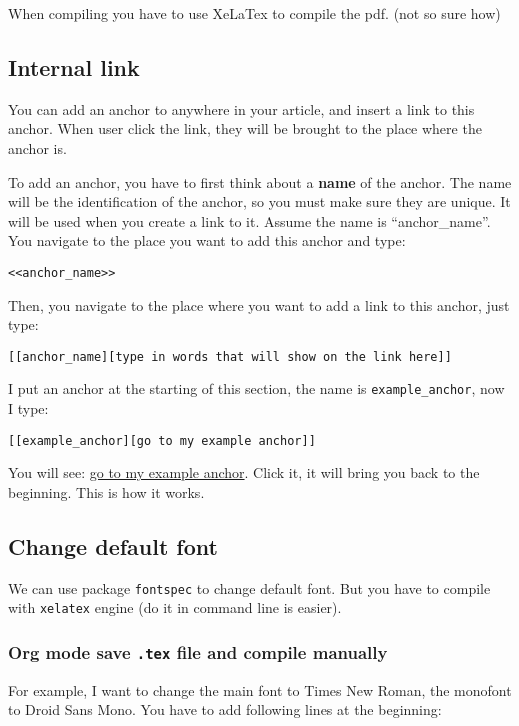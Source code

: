 \documentclass[11pt]{article}
\begin{document}
When compiling you have to use XeLaTex to compile the pdf. (not so sure how)

\subsection{Internal  link \label{org3abc04a}}
\label{sec:org4161ad1}
You can add an anchor to anywhere in your article, and insert a link to this anchor. When user click the link, they will be brought to the place where the anchor is.

To add an anchor, you have to first think about a \textbf{name} of the anchor. The name will be the identification of the anchor, so you must make sure they are unique. It will be used when you create a link to it. Assume the name is ``anchor\_name''. You navigate to the place you want to add this anchor and type:
\begin{Verbatim}[frame=single]
<<anchor_name>>
\end{Verbatim}

Then, you navigate to the place where you want to add a link to this anchor, just type:
\begin{Verbatim}[frame=single]
[[anchor_name][type in words that will show on the link here]]
\end{Verbatim}

I put an anchor at the starting of this section, the name is \texttt{example\_anchor}, now I type:
\begin{Verbatim}[frame=single]
[[example_anchor][go to my example anchor]]
\end{Verbatim}

You will see: \hyperref[org3abc04a]{go to my example anchor}. Click it, it will bring you back to the beginning. This is how it works.


\subsection{Change default font}
\label{sec:orgab3e5e4}
We can use package \texttt{fontspec} to change default font. But you have to compile with \texttt{xelatex} engine (do it in command line is easier).

\subsubsection{Org mode save \texttt{.tex} file and compile manually}
\label{sec:org835d0a1}
For example, I want to change the main font to Times New Roman, the monofont to Droid Sans Mono. You have to add following lines at the beginning:
\end{document}

